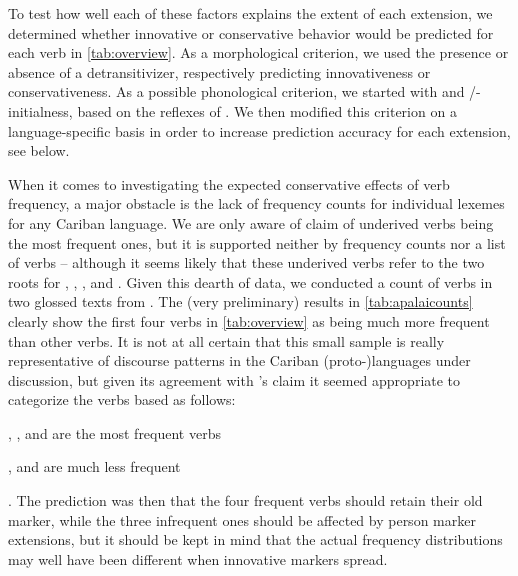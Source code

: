 To test how well each of these factors explains the extent of each extension, we determined whether innovative or conservative behavior would be predicted for each verb in \cref{tab:overview}.
As a morphological criterion, we used the presence or absence of a detransitivizer, respectively predicting innovativeness or conservativeness.
As a possible phonological criterion, we started with  and /-initialness, based on the reflexes of \detrz.
We then modified this criterion on a language-specific basis in order to increase prediction accuracy for each extension, see below.

When it comes to investigating the expected conservative effects of verb frequency, a major obstacle is the lack of frequency counts for individual lexemes for any Cariban language.
We are only aware of  claim of \kalina underived  verbs being the most frequent ones, but it is supported neither by frequency counts nor a list of verbs -- although it seems likely that these underived  verbs refer to the two roots for , , , and .
Given this dearth of data, we conducted a count of  verbs in two glossed texts from \textcite{koehns1994textos}.
The (very preliminary) results in \cref{tab:apalaicounts} clearly show the first four verbs in \cref{tab:overview} as being much more frequent than other  verbs.
It is not at all certain that this small \apalai sample is really representative of discourse patterns in the Cariban (proto-)languages under discussion, but given its agreement with \citeauthor{courtz2008carib}'s claim it seemed appropriate to categorize the verbs based as follows:
\begin{inlinelist}
	\item {}, , and  are the most frequent  verbs
	\item {},  and  are much less frequent
\end{inlinelist}.
The prediction was then that the four frequent verbs should retain their old marker, while the three infrequent ones should be affected by person marker extensions, but it should be kept in mind that the actual frequency distributions may well have been different when innovative markers spread.



